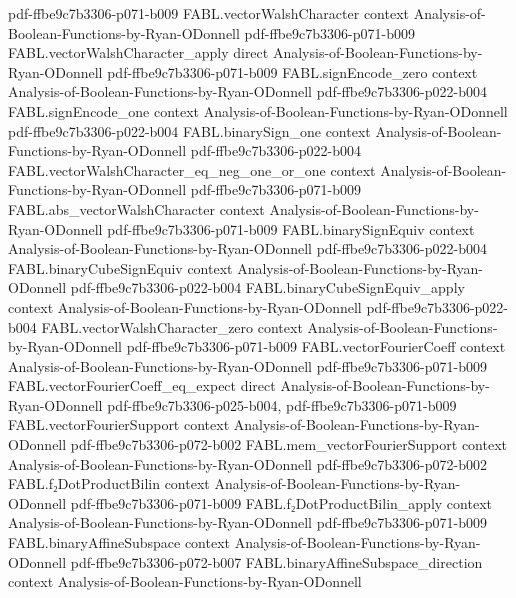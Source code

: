 \begin{theorem}
  {pdf-ffbe9c7b3306-p071-b009}
\proofstep
  {FABL.vectorWalshCharacter}
  {context}
  {Analysis-of-Boolean-Functions-by-Ryan-ODonnell}
  {pdf-ffbe9c7b3306-p071-b009}
\proofstep
  {FABL.vectorWalshCharacter_apply}
  {direct}
  {Analysis-of-Boolean-Functions-by-Ryan-ODonnell}
  {pdf-ffbe9c7b3306-p071-b009}
\proofstep
  {FABL.signEncode_zero}
  {context}
  {Analysis-of-Boolean-Functions-by-Ryan-ODonnell}
  {pdf-ffbe9c7b3306-p022-b004}
\proofstep
  {FABL.signEncode_one}
  {context}
  {Analysis-of-Boolean-Functions-by-Ryan-ODonnell}
  {pdf-ffbe9c7b3306-p022-b004}
\proofstep
  {FABL.binarySign_one}
  {context}
  {Analysis-of-Boolean-Functions-by-Ryan-ODonnell}
  {pdf-ffbe9c7b3306-p022-b004}
\proofstep
  {FABL.vectorWalshCharacter_eq_neg_one_or_one}
  {context}
  {Analysis-of-Boolean-Functions-by-Ryan-ODonnell}
  {pdf-ffbe9c7b3306-p071-b009}
\proofstep
  {FABL.abs_vectorWalshCharacter}
  {context}
  {Analysis-of-Boolean-Functions-by-Ryan-ODonnell}
  {pdf-ffbe9c7b3306-p071-b009}
\proofstep
  {FABL.binarySignEquiv}
  {context}
  {Analysis-of-Boolean-Functions-by-Ryan-ODonnell}
  {pdf-ffbe9c7b3306-p022-b004}
\proofstep
  {FABL.binaryCubeSignEquiv}
  {context}
  {Analysis-of-Boolean-Functions-by-Ryan-ODonnell}
  {pdf-ffbe9c7b3306-p022-b004}
\proofstep
  {FABL.binaryCubeSignEquiv_apply}
  {context}
  {Analysis-of-Boolean-Functions-by-Ryan-ODonnell}
  {pdf-ffbe9c7b3306-p022-b004}
\proofstep
  {FABL.vectorWalshCharacter_zero}
  {context}
  {Analysis-of-Boolean-Functions-by-Ryan-ODonnell}
  {pdf-ffbe9c7b3306-p071-b009}
\proofstep
  {FABL.vectorFourierCoeff}
  {context}
  {Analysis-of-Boolean-Functions-by-Ryan-ODonnell}
  {pdf-ffbe9c7b3306-p071-b009}
\proofstep
  {FABL.vectorFourierCoeff_eq_expect}
  {direct}
  {Analysis-of-Boolean-Functions-by-Ryan-ODonnell}
  {pdf-ffbe9c7b3306-p025-b004,
    pdf-ffbe9c7b3306-p071-b009}
\proofstep
  {FABL.vectorFourierSupport}
  {context}
  {Analysis-of-Boolean-Functions-by-Ryan-ODonnell}
  {pdf-ffbe9c7b3306-p072-b002}
\proofstep
  {FABL.mem_vectorFourierSupport}
  {context}
  {Analysis-of-Boolean-Functions-by-Ryan-ODonnell}
  {pdf-ffbe9c7b3306-p072-b002}
\proofstep
  {FABL.f₂DotProductBilin}
  {context}
  {Analysis-of-Boolean-Functions-by-Ryan-ODonnell}
  {pdf-ffbe9c7b3306-p071-b009}
\proofstep
  {FABL.f₂DotProductBilin_apply}
  {context}
  {Analysis-of-Boolean-Functions-by-Ryan-ODonnell}
  {pdf-ffbe9c7b3306-p071-b009}
\proofstep
  {FABL.binaryAffineSubspace}
  {context}
  {Analysis-of-Boolean-Functions-by-Ryan-ODonnell}
  {pdf-ffbe9c7b3306-p072-b007}
\proofstep
  {FABL.binaryAffineSubspace_direction}
  {context}
  {Analysis-of-Boolean-Functions-by-Ryan-ODonnell}

\end{theorem}
